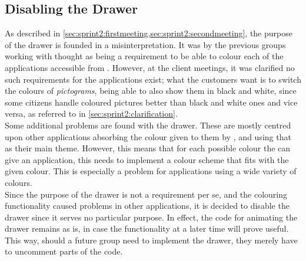 \subsection{Disabling the Drawer}
As described in \cref{sec:sprint2:firstmeeting,sec:sprint2:secondmeeting}, the purpose of the drawer is founded in a misinterpretation.
It was by the previous groups working with \launcher thought as being a requirement to be able to colour each of the \giraf applications accessible from \launcher.
However, at the client meetings, it was clarified no such requirements for the applications exist;
what the customers want is to switch the colours of \textit{pictograms}, being able to also show them in black and white, since some citizens handle coloured pictures better than black and white ones and vice versa, as referred to in \cref{sec:sprint2:clarification}.\\

Some additional problems are found with the drawer.
These are mostly centred upon other applications absorbing the colour given to them by \launcher, and using that as their main theme.
However, this means that for each possible colour the \launcher can give an application, this needs to implement a colour scheme that fits with the given colour.
This is especially a problem for applications using a wide variety of colours.\\

Since the purpose of the drawer is not a requirement per se, and the colouring functionality caused problems in other applications, it is decided to disable the drawer since it serves no particular purpose.
In effect, the code for animating the drawer remains as is, in case the functionality at a later time will prove useful.
This way, should a future group need to implement the drawer, they merely have to uncomment parts of the code.